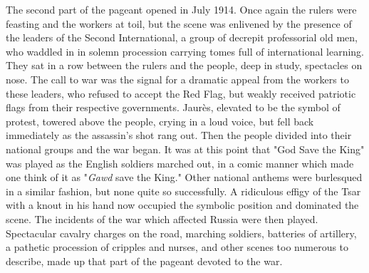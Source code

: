 The second part of the pageant opened in July 1914. Once again the rulers were feasting and the workers at toil, but the scene was enlivened by the presence of the leaders of the Second International, a group of decrepit professorial old men, who waddled in in solemn procession carrying tomes full of international learning. They sat in a row between the rulers and the people, deep in study, spectacles on nose. The call to war was the signal for a dramatic appeal from the workers to these leaders, who refused to accept the Red Flag, but weakly received patriotic flags from their respective governments. Jaurès, elevated to be the symbol of protest, towered above the people, crying in a loud voice, but fell back immediately as the assassin's shot rang out. Then the people divided into their national groups and the war began. It was at this point that "God Save the King" was played as the English soldiers marched out, in a comic manner which made one think of it as "\emph{Gawd} save the King." Other national anthems were burlesqued in a similar fashion, but none quite so successfully. A ridiculous effigy of the Tsar with a knout in his hand now occupied the symbolic position and dominated the scene. The incidents of the war which affected Russia were then played. Spectacular cavalry charges on the road, marching soldiers, batteries of artillery, a pathetic procession of cripples and nurses, and other scenes too numerous to describe, made up that part of the pageant devoted to the war.

